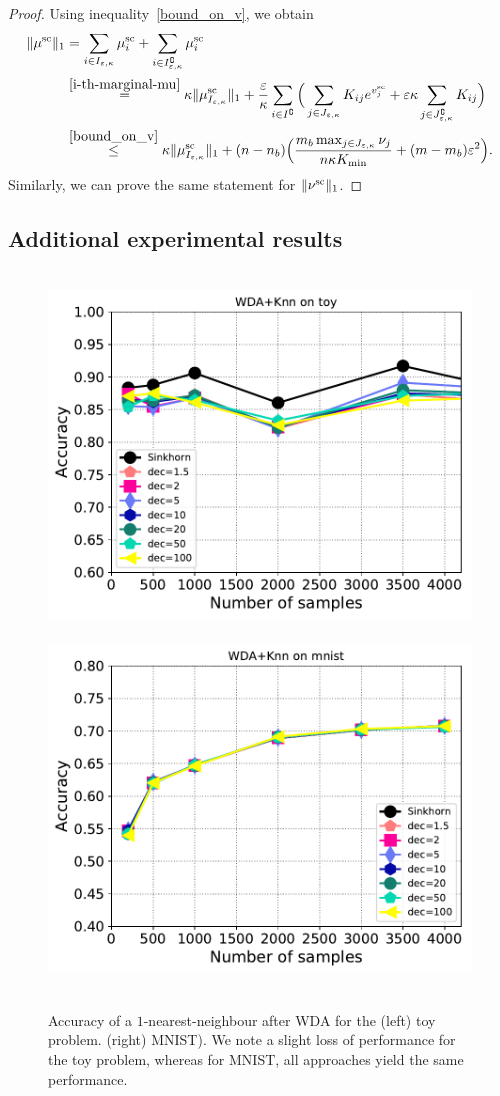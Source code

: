 \begin{proof}
Using inequality~\eqref{bound_on_v}, we obtain 
\begin{align*}
\|\mu^{\text{sc}}\|_1 &= \sum_{i \in I_{\varepsilon,\kappa}} \mu^{\text{sc}}_i +  \sum_{i \in I^\complement_{\varepsilon,\kappa}}\mu^{\text{sc}}_i\\
& \overset{\eqref{i-th-marginal-mu}}{=} \kappa \|\mu_{I_{\varepsilon,\kappa}}^{\text{sc}}\|_1 + \frac \varepsilon\kappa \sum_{i \in I^\complement}\Big( \sum_{j \in J_{\varepsilon,\kappa}} K_{ij} e^{v^{\text{sc}}_j} + \varepsilon\kappa \sum_{j\in J^\complement_{\varepsilon,\kappa}}K_{ij}\Big)\\
& \overset{\eqref{bound_on_v}}{\leq} \kappa \|\mu_{I_{\varepsilon,\kappa}}^{\text{sc}}\|_1 + (n-n_b) \Big(\frac{m_b\max_{j \in J_{\varepsilon,\kappa}} \nu_j}{n\kappa K_{\min}} + (m-m_b)\varepsilon^2 \Big).
\end{align*}
Similarly, we can prove the same statement for $\|\nu^{\text{sc}}\|_1$.
\end{proof}

\subsection{Additional experimental results}

\begin{figure}[htbp]
	\centering
	~\hfill~\includegraphics[width=6.cm]{./figs/wda_accur_toy.pdf}~\hfill~
	\includegraphics[width=6.cm]{./figs/wda_accur_mnist.pdf}~\hfill~\\
	\caption{Accuracy of a $1$-nearest-neighbour after WDA for the (left) toy problem.
		(right) MNIST). We note a slight loss of performance for the toy problem, whereas for MNIST, all approaches yield the same performance. 
		\label{fig:wda_gain}}
\end{figure}

